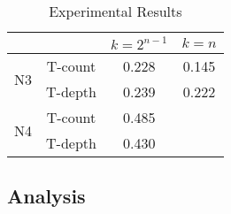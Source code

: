 
\begin{table}[t]
  \begin{center}
    \scalebox{1.0} {
      \begin{tabular}{c|c|c|c}\hline
                            &         & $k=2^{n-1}$ & $k=n$    \\\hline
        \multirow{2}{*}{N3} & T-count &  0.228      & 0.145    \\\cline{2-4}
                            & T-depth &  0.239      & 0.222    \\\hline
        \multirow{2}{*}{N4} & T-count &  0.485      &          \\\cline{2-4}
                            & T-depth &  0.430      &          \\\hline

\end{tabular}        
    }
  \end{center}
  \caption{Experimental Results}
  \label{table-results}
\end{table}


\subsection{Analysis}
\label{Exp:An}

